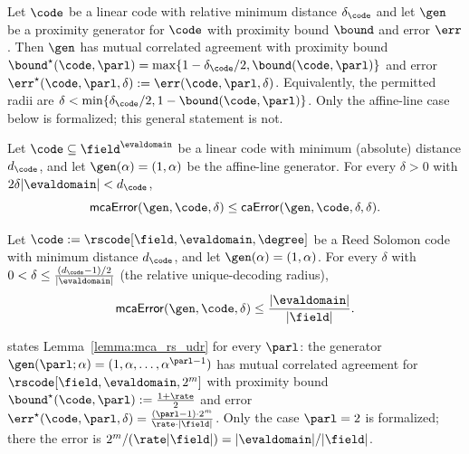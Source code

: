 \begin{lemma}\label{lemma:gen_mutual_corr_agreement}
    Let $\code$ be a linear code with relative minimum distance $\delta_{\code}$ and let $\gen$ be a proximity generator for $\code$ with proximity bound ${\bound}$ and error $\err$. Then $\gen$ has mutual correlated agreement with proximity bound ${\bound}^\star(\code, \parl) = \max\{1 - \delta_{\code}/2, \bound(\code, \parl)\}$ and error $\err^\star(\code, \parl, \delta) := \err(\code, \parl, \delta)$. Equivalently, the permitted radii are $\delta < \min\{\delta_{\code}/2, 1-\bound(\code,\parl)\}$.
    Only the affine-line case below is formalized; this general statement is not.
\end{lemma}

\begin{lemma}\label{lemma:mca_affine_line_udr}
\leanok
{}
    Let $\code\subseteq\field^{\evaldomain}$ be a linear code with minimum (absolute) distance
    $d_{\code}$, and let $\gen(\alpha)=(1,\alpha)$ be the affine-line generator. For every
    $\delta>0$ with $2\delta|\evaldomain|<d_{\code}$,
    \[
      \mathsf{mcaError}(\gen,\code,\delta)\le\mathsf{caError}(\gen,\code,\delta,\delta).
    \]
\end{lemma}

\begin{lemma}\label{lemma:mca_rs_udr}
\leanok
{}
    Let $\code := \rscode[\field, \evaldomain, \degree]$ be a Reed Solomon code with minimum
    distance $d_{\code}$, and let $\gen(\alpha)=(1,\alpha)$. For every $\delta$ with
    $0<\delta\le\frac{(d_{\code}-1)/2}{|\evaldomain|}$ (the relative unique-decoding radius),
    \[
      \mathsf{mcaError}(\gen,\code,\delta)\le\frac{|\evaldomain|}{|\field|}.
    \]
\end{lemma}

\begin{remark}
\cite{ACFY24} states Lemma~\ref{lemma:mca_rs_udr} for every $\parl$: the generator
$\gen(\parl; \alpha) = (1, \alpha, \ldots, \alpha^{\parl - 1})$ has mutual correlated agreement
for $\rscode[\field, \evaldomain, 2^m]$ with proximity bound ${\bound}^\star(\code, \parl) :=
\frac{1 + \rate}{2}$ and error $\err^\star(\code, \parl, \delta) = \frac{(\parl - 1) \cdot
2^m}{\rate \cdot |\field|}$. Only the case $\parl=2$ is formalized; there the error is
$2^m/(\rate|\field|)=|\evaldomain|/|\field|$.
\end{remark}

